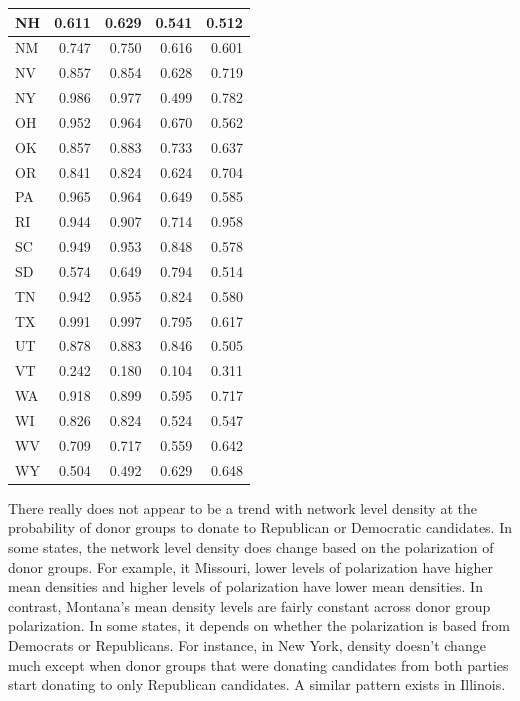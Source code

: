 \documentclass[]{article}
\begin{document}
\begin{table}[!h]
\begin{tabular}{l|r|r|r|r}
\hline
\rowcolor{gray!6}  NH & 0.611 & 0.629 & 0.541 & 0.512\\
\hline
NM & 0.747 & 0.750 & 0.616 & 0.601\\
\hline
\rowcolor{gray!6}  NV & 0.857 & 0.854 & 0.628 & 0.719\\
\hline
NY & 0.986 & 0.977 & 0.499 & 0.782\\
\hline
\rowcolor{gray!6}  OH & 0.952 & 0.964 & 0.670 & 0.562\\
\hline
OK & 0.857 & 0.883 & 0.733 & 0.637\\
\hline
\rowcolor{gray!6}  OR & 0.841 & 0.824 & 0.624 & 0.704\\
\hline
PA & 0.965 & 0.964 & 0.649 & 0.585\\
\hline
\rowcolor{gray!6}  RI & 0.944 & 0.907 & 0.714 & 0.958\\
\hline
SC & 0.949 & 0.953 & 0.848 & 0.578\\
\hline
\rowcolor{gray!6}  SD & 0.574 & 0.649 & 0.794 & 0.514\\
\hline
TN & 0.942 & 0.955 & 0.824 & 0.580\\
\hline
\rowcolor{gray!6}  TX & 0.991 & 0.997 & 0.795 & 0.617\\
\hline
UT & 0.878 & 0.883 & 0.846 & 0.505\\
\hline
\rowcolor{gray!6}  VT & 0.242 & 0.180 & 0.104 & 0.311\\
\hline
WA & 0.918 & 0.899 & 0.595 & 0.717\\
\hline
\rowcolor{gray!6}  WI & 0.826 & 0.824 & 0.524 & 0.547\\
\hline
WV & 0.709 & 0.717 & 0.559 & 0.642\\
\hline
\rowcolor{gray!6}  WY & 0.504 & 0.492 & 0.629 & 0.648\\
\hline
\end{tabular}
\end{table}

There really does not appear to be a trend with network level density at
the probability of donor groups to donate to Republican or Democratic
candidates. In some states, the network level density does change based
on the polarization of donor groups. For example, it Missouri, lower
levels of polarization have higher mean densities and higher levels of
polarization have lower mean densities. In contrast, Montana's mean
density levels are fairly constant across donor group polarization. In
some states, it depends on whether the polarization is based from
Democrats or Republicans. For instance, in New York, density doesn't
change much except when donor groups that were donating candidates from
both parties start donating to only Republican candidates. A similar
pattern exists in Illinois.
\end{document}
